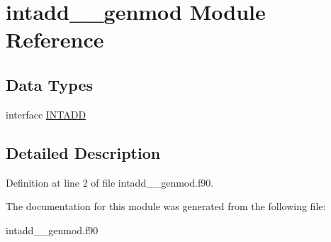 \hypertarget{classintadd____genmod}{\section{intadd\+\_\+\+\_\+genmod Module Reference}
\label{classintadd____genmod}
}
\subsection*{Data Types}
\begin{DoxyCompactItemize}
\item 
interface \hyperlink{interfaceintadd____genmod_1_1_i_n_t_a_d_d}{I\+N\+T\+A\+D\+D}
\end{DoxyCompactItemize}


\subsection{Detailed Description}


Definition at line 2 of file intadd\+\_\+\+\_\+genmod.\+f90.



The documentation for this module was generated from the following file\+:\begin{DoxyCompactItemize}
\item 
intadd\+\_\+\+\_\+genmod.\+f90\end{DoxyCompactItemize}
